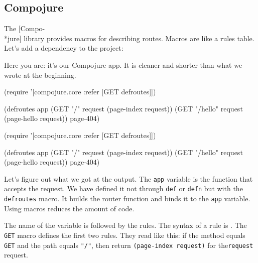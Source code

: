 \subsection{Compojure}

\label{compojure}


The [Compo-\\*jure] library provides macros for describing routes. Macros are like a rules table.
Let's add a dependency to the project:

\begin{english}
\begin{clojure}
[compojure "1.6.1"]
\end{clojure}
\end{english}

Here you are: it's our Compojure app. It is cleaner and shorter than what we wrote at the beginning.

\ifx\devicetype\mobile

\begin{english}
\begin{clojure}
(require '[compojure.core
:refer [GET defroutes]])

(defroutes app
(GET "/" request
(page-index request))
(GET "/hello" request
(page-hello request))
page-404)
\end{clojure}
\end{english}

\else

\begin{english}
\begin{clojure}
(require '[compojure.core :refer [GET defroutes]])

(defroutes app
(GET "/"      request (page-index request))
(GET "/hello" request (page-hello request))
page-404)
\end{clojure}
\end{english}

\fi

Let's figure out what we got at the output. The \verb|app| variable is the function that accepts the request. We have defined it not through \verb|def| or \verb|defn| but with 
the \verb|defroutes| macro. It builds the router function and binds it to the \verb|app| variable. Using macros reduces the amount of code.

The name of the variable is followed by the rules. The syntax of a rule is .
The \verb|GET| macro defines the first two rules. They read like this:
if the method equals \verb|GET| and the path equals \verb|"/"|, then return \verb|(page-index request)| for the\verb|request| request.

